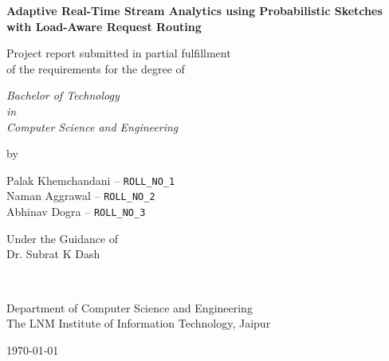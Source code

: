 \thispagestyle{empty}
\begin{center}
{\Large \bf Adaptive Real-Time Stream Analytics using Probabilistic Sketches with Load-Aware Request Routing}

\vspace*{1.75cm}
{\large Project report submitted in partial fulfillment\\}
{\large of the requirements for the degree of \\}

\vspace*{1cm}
{\it {\large Bachelor of Technology} \\
{\large in\\}
{\large Computer Science and Engineering \\}}

\vspace*{1cm}
{\large by}

\vspace*{1cm}
{\large Palak Khemchandani \quad -- \quad \texttt{ROLL\_NO\_1} \\}
{\large Naman Aggrawal \quad -- \quad \texttt{ROLL\_NO\_2} \\}
{\large Abhinav Dogra \quad -- \quad \texttt{ROLL\_NO\_3} \\}

\vspace*{5mm}
{\large Under the Guidance of \\}
{\large Dr. Subrat K Dash \\}

\vspace*{1.0cm}
{\\}

\vspace*{2.0cm}
{\large Department of Computer Science and Engineering \\}
{\large The LNM Institute of Information Technology, Jaipur\\}

\vspace*{1.0cm}
{\large \today\\}
\end{center}

\clearpage
